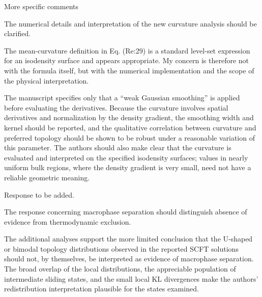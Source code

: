 \documentclass[../ResponsetoReviewers.tex]{subfiles}
\begin{document}
\begin{reviewersection}
\begin{reviewergroup}{More specific comments}
\begin{qa}
    The numerical details and interpretation of the new curvature analysis should be clarified.


    The mean-curvature definition in Eq. (Re:29) is a standard level-set expression for an isodensity surface and appears appropriate.
    My concern is therefore not with the formula itself, but with the numerical implementation and the scope of the physical interpretation.


    The manuscript specifies only that a “weak Gaussian smoothing” is applied before evaluating the derivatives.
    Because the curvature involves spatial derivatives and normalization by the density gradient, the smoothing width and kernel should be reported, and the qualitative correlation between curvature and preferred topology should be shown to be robust under a reasonable variation of this parameter.
    The authors should also make clear that the curvature is evaluated and interpreted on the specified isodensity surfaces; values in nearly uniform bulk regions, where the density gradient is very small, need not have a reliable geometric meaning.
\end{qa}
\begin{reply}
    Response to be added.
\end{reply}


\begin{qa}
    The response concerning macrophase separation should distinguish absence of evidence from thermodynamic exclusion.


    The additional analyses support the more limited conclusion that the U-shaped or bimodal topology distributions observed in the reported SCFT solutions should not, by themselves, be interpreted as evidence of macrophase separation.
    The broad overlap of the local distributions, the appreciable population of intermediate sliding states, and the small local KL divergences make the authors’ redistribution interpretation plausible for the states examined.



\end{qa}
\end{reviewergroup}
\end{reviewersection}
\end{document}
